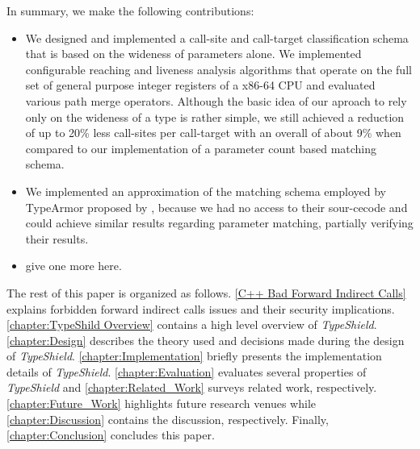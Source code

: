 In summary, we make the following contributions:
\label{Contribution}
\begin{itemize}
 \item We designed and implemented a call-site and call-target classification schema
 that is based on the wideness of parameters alone. We implemented configurable reaching and liveness analysis algorithms
 that operate on the full set of general purpose integer registers of a x86-64 CPU and evaluated various path merge operators.
 Although the basic idea of our aproach to rely only on the wideness of a type is rather simple, we still achieved a reduction
 of up to 20\% less call-sites per call-target with an overall of about 9\% when compared to our implementation of a parameter
 count based matching schema.

 \item We implemented an approximation of the matching schema employed by TypeArmor proposed by \cite{veen:typearmor}, 
 because we had no access to their sour-cecode and could achieve similar results regarding parameter matching, partially verifying
 their results.
 
 \item give one more here.
  
\end{itemize}

\label{Outline}
The rest of this paper is organized as follows.
\cref{C++ Bad Forward Indirect Calls} explains forbidden forward indirect calls issues and their security implications.
\cref{chapter:TypeShild Overview} contains a high level overview of \textit{TypeShield}.
\cref{chapter:Design} describes the theory used and decisions made during the design of \textit{TypeShield}.
\cref{chapter:Implementation} briefly presents the implementation details of \textit{TypeShield}.
\cref{chapter:Evaluation} evaluates several properties of \textit{TypeShield} and
\cref{chapter:Related_Work} surveys related work, respectively.
\cref{chapter:Future_Work} highlights future research venues while 
\cref{chapter:Discussion} contains the discussion, respectively.
Finally, \cref{chapter:Conclusion} concludes this paper.


